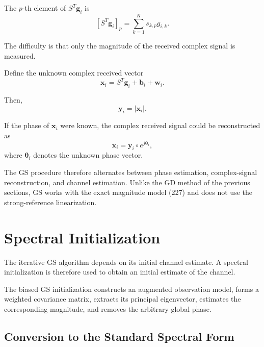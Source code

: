 \documentclass[12pt,a4paper]{article}
\begin{document}
The $p$-th element of $S^T\mathbf g_i$ is
\begin{equation}
\left[S^T\mathbf g_i\right]_p
=
\sum_{k=1}^{K}
s_{k,p}g_{i,k}.
\tag{228}
\end{equation}

The difficulty is that only the magnitude of the received complex
signal is measured.

Define the unknown complex received vector
\begin{equation}
\boxed{
\mathbf x_i
=
S^T\mathbf g_i+\mathbf b_i+\mathbf w_i
}.
\tag{229}
\end{equation}

Then,
\begin{equation}
\mathbf y_i=|\mathbf x_i|.
\tag{230}
\end{equation}

If the phase of $\mathbf x_i$ were known, the complex received signal
could be reconstructed as
\begin{equation}
\mathbf x_i
=
\mathbf y_i\circ e^{j\boldsymbol\theta_i},
\tag{231}
\end{equation}
where $\boldsymbol\theta_i$ denotes the unknown phase vector.

The GS procedure therefore alternates between phase estimation,
complex-signal reconstruction, and channel estimation. Unlike the GD
method of the previous sections, GS works with the exact magnitude
model (227) and does not use the strong-reference linearization.

\section{Spectral Initialization}

The iterative GS algorithm depends on its initial channel estimate.
A spectral initialization is therefore used to obtain an initial
estimate of the channel.

The biased GS initialization constructs an augmented observation
model, forms a weighted covariance matrix, extracts its principal
eigenvector, estimates the corresponding magnitude, and removes the
arbitrary global phase.

\subsection{Conversion to the Standard Spectral Form}
\end{document}
